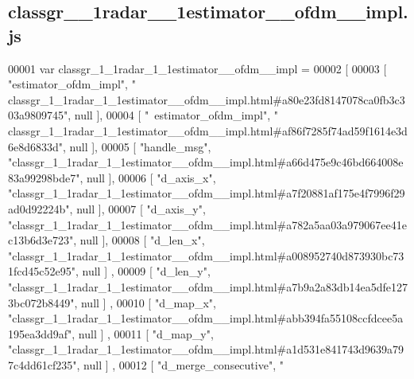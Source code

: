 \subsection{classgr\+\_\+\_\+1radar\+\_\+\_\+1estimator\+\_\+\+\_\+ofdm\+\_\+\+\_\+impl.\+js}
\label{classgr__1__1radar__1__1estimator____ofdm____impl_8js_source}

\begin{DoxyCode}
00001 var classgr_1_1radar_1_1estimator__ofdm__impl =
00002 [
00003     [ \textcolor{stringliteral}{"estimator\_ofdm\_impl"}, \textcolor{stringliteral}{"
      classgr\_1\_1radar\_1\_1estimator\_\_ofdm\_\_impl.html#a80e23fd8147078ca0fb3c303a9809745"}, null ],
00004     [ \textcolor{stringliteral}{"~estimator\_ofdm\_impl"}, \textcolor{stringliteral}{"
      classgr\_1\_1radar\_1\_1estimator\_\_ofdm\_\_impl.html#af86f7285f74ad59f1614e3d6e8d6833d"}, null ],
00005     [ \textcolor{stringliteral}{"handle\_msg"}, \textcolor{stringliteral}{"classgr\_1\_1radar\_1\_1estimator\_\_ofdm\_\_impl.html#a66d475e9c46bd664008e83a99298bde7"}, 
      null ],
00006     [ \textcolor{stringliteral}{"d\_axis\_x"}, \textcolor{stringliteral}{"classgr\_1\_1radar\_1\_1estimator\_\_ofdm\_\_impl.html#a7f20881af175e4f7996f29ad0d92224b"}, null 
      ],
00007     [ \textcolor{stringliteral}{"d\_axis\_y"}, \textcolor{stringliteral}{"classgr\_1\_1radar\_1\_1estimator\_\_ofdm\_\_impl.html#a782a5aa03a979067ee41ec13b6d3e723"}, null 
      ],
00008     [ \textcolor{stringliteral}{"d\_len\_x"}, \textcolor{stringliteral}{"classgr\_1\_1radar\_1\_1estimator\_\_ofdm\_\_impl.html#a008952740d873930bc731fcd45c52e95"}, null ]
      ,
00009     [ \textcolor{stringliteral}{"d\_len\_y"}, \textcolor{stringliteral}{"classgr\_1\_1radar\_1\_1estimator\_\_ofdm\_\_impl.html#a7b9a2a83db14ea5dfe1273bc072b8449"}, null ]
      ,
00010     [ \textcolor{stringliteral}{"d\_map\_x"}, \textcolor{stringliteral}{"classgr\_1\_1radar\_1\_1estimator\_\_ofdm\_\_impl.html#abb394fa55108ccfdcee5a195ea3dd9af"}, null ]
      ,
00011     [ \textcolor{stringliteral}{"d\_map\_y"}, \textcolor{stringliteral}{"classgr\_1\_1radar\_1\_1estimator\_\_ofdm\_\_impl.html#a1d531e841743d9639a797c4dd61cf235"}, null ]
      ,
00012     [ \textcolor{stringliteral}{"d\_merge\_consecutive"}, \textcolor{stringliteral}{"
}
\end{DoxyCode}
